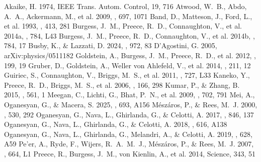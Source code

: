 \documentclass[twocolumn]{aastex631}
\begin{document}
\begin{thebibliography}{}
 Akaike, H. 1974, IEEE Trans. Autom. Control, 19, 716
 Atwood, W.~B., Abdo, A.~A., Ackermann, M., et al. 2009, \apj, 697, 1071
 Band, D., Matteson, J., Ford, L., et al. 1993, \apj, 413, 281
 Burgess, J.~M., Preece, R.~D., Connaughton, V., et al. 2014a, \apjl, 784, L43
 Burgess, J.~M., Preece, R.~D., Connaughton, V., et al. 2014b, \apj, 784, 17
 Busby, K., \& Lazzati, D. 2024, \apj, 972, 83
 D'Agostini, G. 2005, arXiv:physics/0511182
 Goldstein, A., Burgess, J.~M., Preece, R.~D., et al. 2012, \apjs, 199, 19
 Gruber, D., Goldstein, A., Weller von Ahlefeld, V., et al. 2014, \apjs, 211, 12
 Guiriec, S., Connaughton, V., Briggs, M.~S., et al. 2011, \apjl, 727, L33
 Kaneko, Y., Preece, R.~D., Briggs, M.~S., et al. 2006, \apjs, 166, 298
 Kumar, P., \& Zhang, B. 2015, \physrep, 561, 1
 Meegan, C., Lichti, G., Bhat, P.~N., et al. 2009, \apj, 702, 791
 Mei, A., Oganesyan, G., \& Macera, S. 2025, \aap, 693, A156
 M\'esz\'aros, P., \& Rees, M.~J. 2000, \apj, 530, 292
 Oganesyan, G., Nava, L., Ghirlanda, G., \& Celotti, A. 2017, \apj, 846, 137
 Oganesyan, G., Nava, L., Ghirlanda, G., \& Celotti, A. 2018, \aap, 616, A138
 Oganesyan, G., Nava, L., Ghirlanda, G., Melandri, A., \& Celotti, A. 2019, \aap, 628, A59
 Pe'er, A., Ryde, F., Wijers, R.~A.~M.~J., M\'esz\'aros, P., \& Rees, M.~J. 2007, \apjl, 664, L1
 Preece, R., Burgess, J.~M., von Kienlin, A., et al. 2014, Science, 343, 51

\end{thebibliography}
\end{document}
